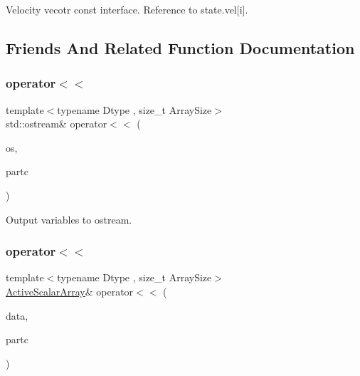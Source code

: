 Velocity vecotr const interface. Reference to state.\+vel\mbox{[}i\mbox{]}. 



\subsection{Friends And Related Function Documentation}
\mbox{\label{classparticles_ad63b4422bc47e18c1398e1f69656f66e}} 
\subsubsection{\texorpdfstring{operator$<$$<$}{operator<<}\hspace{0.1cm}{\footnotesize\ttfamily [1/2]}}
{\footnotesize\ttfamily template$<$typename Dtype , size\+\_\+t Array\+Size$>$ \\
std\+::ostream\& operator$<$$<$ (\begin{DoxyParamCaption}\item[{std\+::ostream \&}]{os,  }\item[{const \mbox{\hyperlink{classparticles}{particles}}$<$ Dtype, Array\+Size $>$ \&}]{partc }\end{DoxyParamCaption})\hspace{0.3cm}{\ttfamily [friend]}}



Output variables to ostream. 

\mbox{\label{classparticles_a4ea2cae8268f24456db3fcb615e36c29}} 
\subsubsection{\texorpdfstring{operator$<$$<$}{operator<<}\hspace{0.1cm}{\footnotesize\ttfamily [2/2]}}
{\footnotesize\ttfamily template$<$typename Dtype , size\+\_\+t Array\+Size$>$ \\
\mbox{\hyperlink{classparticles_a1a7d26adb64aacc4201e6bbb9de64c47}{Active\+Scalar\+Array}}\& operator$<$$<$ (\begin{DoxyParamCaption}\item[{\mbox{\hyperlink{classparticles_a1a7d26adb64aacc4201e6bbb9de64c47}{Active\+Scalar\+Array}} \&}]{data,  }\item[{const \mbox{\hyperlink{classparticles}{particles}}$<$ Dtype, Array\+Size $>$ \&}]{partc }\end{DoxyParamCaption})\hspace{0.3cm}{\ttfamily [friend]}}



